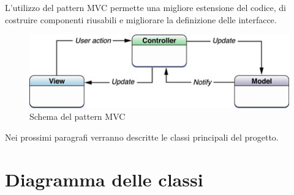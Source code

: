 L'utilizzo del pattern MVC permette una migliore estensione del codice, di costruire componenti riusabili e migliorare la definizione delle interfacce.

\begin{figure}[!htbp]
\centering
\includegraphics[scale=0.70]{architettura/mvc.png}
\caption{Schema del pattern MVC}
\label{fig:selettore}
\end{figure}

Nei prossimi paragrafi verranno descritte le classi principali del progetto.

\section{Diagramma delle classi}